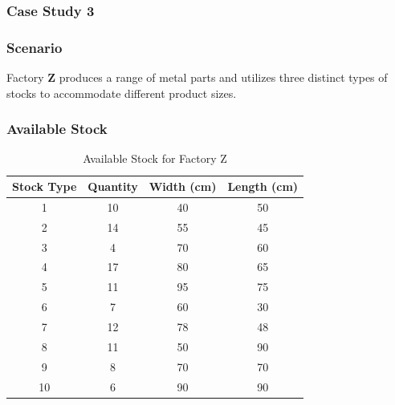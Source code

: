 \documentclass[a4paper]{article}
\begin{document}
\begin{table}[h!]
        \centering
        \caption{Evaluation Using Our Code}
    \end{table}
    
\FloatBarrier
 \subsubsection{Case Study 3}
\subsubsection*{Scenario}
Factory \textbf{Z} produces a range of metal parts and utilizes three distinct types of stocks to accommodate different product sizes.

\subsubsection*{Available Stock}
\begin{table}[H]
    \centering
    \caption{Available Stock for Factory Z}
    \begin{tabular}{|c|c|c|c|}
        \hline
        \textbf{Stock Type} & \textbf{Quantity} & \textbf{Width (cm)} & \textbf{Length (cm)} \\ \hline
        1 & 10 & 40 & 50 \\ \hline
        2 & 14 & 55 & 45 \\ \hline
        3 & 4 & 70 & 60 \\ \hline
        4 & 17 & 80 & 65 \\ \hline
        5 & 11 & 95 & 75 \\ \hline
        6 & 7 & 60 & 30 \\ \hline
        7 & 12 & 78 & 48 \\ \hline
        8 & 11 & 50 & 90 \\ \hline
        9 & 8 & 70 & 70 \\ \hline
        10 & 6 & 90 & 90 \\ \hline
    \end{tabular}
\end{table}
\end{document}
